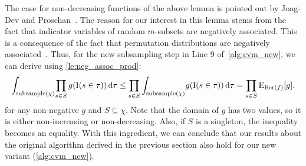 The case for non-decreasing functions of the above lemma is pointed out by Joag-Dev and Proschan~\cite[P.2]{joagdev1983}.
The reason for our interest in this lemma stems from the fact that indicator variables of random $m$-subsets are negatively associated.
This is a consequence of the fact that permutation distributions are negatively associated~\cite[Th. 2.11]{joagdev1983}.
Thus, for the new subsampling step in Line 9 of~\cref{alg:cvm_new}, we can derive using \cref{le:neg_assoc_prod}:
\begin{equation}\label{eq:subsample_with_n_subsets}
  \int_{\mathrm{subsample}(\chi)} \! \prod_{s \in S} g(\operatorname{\mathrm{I}}(s \in \tau)) \, \mathrm{d} \tau \leq
  \prod_{s \in S} \int_{\mathrm{subsample}(\chi)} \! g(\operatorname{\mathrm{I}}(s \in \tau)) \, \mathrm{d} \tau = \prod_{s \in S}  \operatorname{\mathrm{E}}_{\operatorname{\mathrm{Ber}}(f)}[g] \textrm{.}
\end{equation}
for any non-negative $g$ and $S \subseteq \chi$.
Note that the domain of $g$ has two values, so it is either non-increasing or non-decreasing.
Also, if $S$ is a singleton, the inequality becomes an equality.
With this ingredient, we can conclude that our results about the original algorithm derived in the previous section also hold for our new variant (\cref{alg:cvm_new}).
